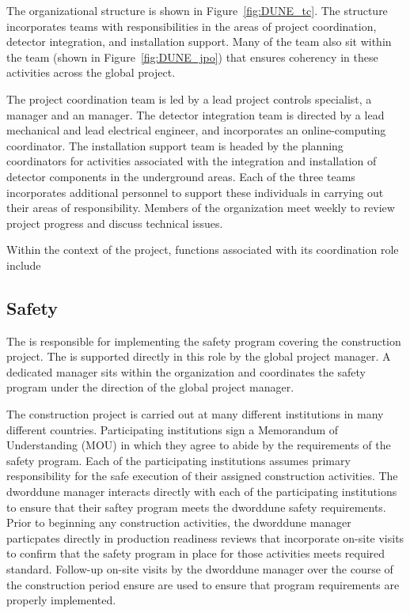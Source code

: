 The   organizational structure is shown in 
Figure~\ref{fig:DUNE_tc}.  The structure incorporates teams with 
responsibilities in the areas of project coordination, detector integration,
and installation support.  Many of the  team also sit within 
the  team (shown in Figure~\ref{fig:DUNE_jpo}) that ensures 
coherency in these activities across the global project. 

The project coordination team is led by a lead project controls
specialist, a  manager and an  manager.  The
detector integration team is directed by a lead mechanical and lead
electrical engineer, and incorporates an online-computing coordinator.
The installation support team is headed by the planning coordinators 
for activities associated with the integration and installation of 
detector components in the underground areas.  Each of the three 
teams incorporates additional personnel to support these individuals 
in carrying out their areas of responsibility.  Members of the 
 organization meet weekly to review project progress and 
discuss %
technical issues. 
     
Within the context of the  project,  functions 
associated with its coordination role include

\subsection{Safety}

The  is responsible for implementing the safety program
covering the  construction project.  The 
is supported directly in this role by the global project 
manager.  A dedicated   manager sits within
the  organization and coordinates the  safety
program under the direction of the global project  manager.

The  construction project is carried out at many different
institutions in many different countries.  Participating institutions
sign a Memorandum of Understanding (MOU) in which they agree to abide
by the requirements of the  safety program.  Each of the
participating institutions assumes primary responsibility for the safe
execution of their assigned construction activities.  The dword{dune}
 manager interacts directly with each of the participating
institutions to ensure that their saftey program meets the dword{dune}
safety requirements.  Prior to beginning any construction activities,
the dword{dune}  manager particpates directly in production
readiness reviews that incorporate on-site visits to confirm that the
safety program in place for those activities meets required standard.
Follow-up on-site visits by the dword{dune}  manager over
the course of the construction period ensure are used to ensure that
program requirements are properly implemented.


